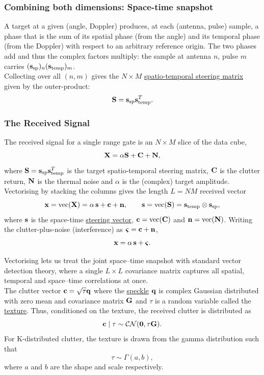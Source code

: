 \documentclass{article}
\begin{document}
\subsubsection{Combining both dimensions: Space-time snapshot}
A target at a given (angle, Doppler) produces, at each (antenna, pulse) sample, a phase that is the sum of its spatial phase (from the angle) and its temporal phase (from the Doppler) with respect to an arbitrary reference origin. The two phases add and thus the complex factors multiply: the sample at antenna $n$, pulse $m$ carries $(\vb s_\text{sp})_n(\vb s_\text{temp})_m$.\\

Collecting over all $(n, m)$ gives the $N\times M$ \underline{spatio-temporal steering matrix} given by the outer-product: $$\mathbf{S} = \vb s_\text{sp} \vb s_\text{temp}^T.$$

\subsubsection{The Received Signal}
The received signal for a single range gate is an $N\times M$ slice of the data cube, $$\mathbf{X} = \alpha\mathbf{S} + \mathbf{C} + \mathbf{N},$$ where $\mathbf{S}=\vb s_\text{sp}\vb s_\text{temp}^T$ is the target spatio-temporal steering matrix, $\mathbf{C}$ is the clutter return, $\mathbf{N}$ is the thermal noise and $\alpha$ is the (complex) target amplitude.\\

Vectorising by stacking the columns gives the length $L=NM$ received vector $$\vb x = \operatorname{vec}(\mathbf{X}) = \alpha\,\vb s + \vb c + \vb n,\qquad \vb s = \operatorname{vec}(\mathbf{S}) = \vb s_\text{temp}\otimes\vb s_\text{sp},$$ where $\vb s$ is the space-time \underline{steering vector}, $\vb c = \operatorname{vec}(\mathbf{C})$ and $\vb n = \operatorname{vec}(\mathbf{N})$. Writing the clutter-plus-noise (interference) as $\boldsymbol{\varsigma}=\vb c+\vb n$, $$\vb x = \alpha\,\vb s + \boldsymbol{\varsigma}.$$

Vectorising lets us treat the joint space--time snapshot with standard vector
detection theory, where a single $L\times L$ covariance matrix captures all spatial,
temporal and space--time correlations at once.\\

The clutter vector $\vb c = \sqrt{\tau} \vb q$ where the \underline{speckle} $\vb q$ is complex Gaussian distributed with zero mean and covariance matrix $\mathbf{G}$ and $\tau$ is a random variable called the \underline{texture}. Thus, conditioned on the texture, the received clutter is distributed as $$\vb c \mid \tau \sim \mathcal{CN}(\vb 0, \tau\mathbf{G}).$$ For K-distributed clutter, the texture is drawn from the gamma distribution such that $$\tau\sim\Gamma(a, b),$$ where $a$ and $b$ are the shape and scale respectively.
\end{document}
